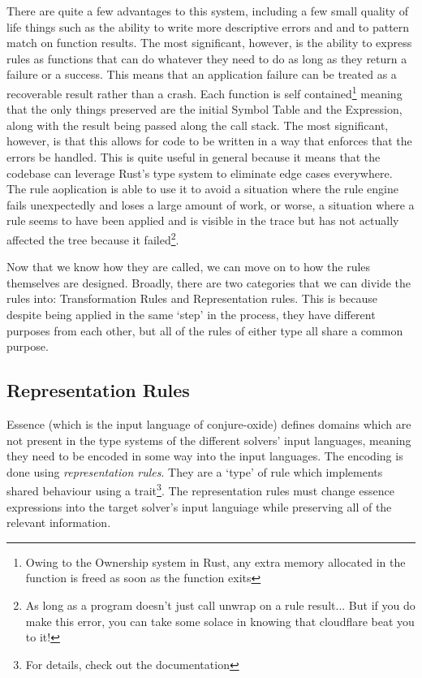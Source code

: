 There are quite a few advantages to this system, including a few small quality of life things such as the ability to write more descriptive errors and and to pattern match on function results. The most significant, however, is the ability to express rules as functions that can do whatever they need to do as long as they return a failure or a success. This means that an application failure can be treated as a recoverable result rather than a crash. Each function is self contained\footnote{Owing to the Ownership system in Rust, any extra memory allocated in the function is freed as soon as the function exits} meaning that the only things preserved are the initial Symbol Table and the Expression, along with the result being passed along the call stack. The most significant, however, is that this allows for code to be written in a way that enforces that the errors be handled. This is quite useful in general because it means that the codebase can leverage Rust's type system to eliminate edge cases everywhere. The rule aoplication is able to use it to avoid a situation where the rule engine fails unexpectedly and loses a large amount of work, or worse, a situation where a rule seems to have been applied and is visible in the trace but has not actually affected the tree because it failed\footnote{As long as a program doesn't just call unwrap on a rule result... But if you do make this error, you can take some solace in knowing that cloudflare beat you to it!}. 

Now that we know how they are called, we can move on to how the rules themselves are designed. Broadly, there are two categories that we can divide the rules into: Transformation Rules and Representation rules. This is because despite being applied in the same `step' in the process, they have different purposes from each other, but all of the rules of either type all share a common purpose. 

\subsection{Representation Rules}

Essence (which is the input language of conjure-oxide) defines domains which are not present in the type systems of the different solvers' input languages, meaning they need to be encoded in some way into the input languages. The encoding is done using \textit{representation rules}. They are a `type' of rule which implements shared behaviour using a trait\footnote{For details, check out the documentation}. The representation rules must change essence expressions into the target solver's input languiage while preserving all of the relevant information. 